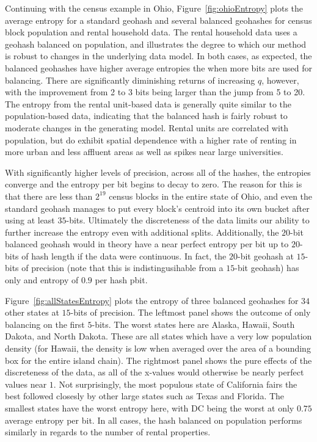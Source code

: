 \documentclass[nips13submit_09,times,art10]{article} %
\begin{document}
Continuing with the census example in Ohio, Figure~\ref{fig:ohioEntropy} plots the average
entropy for a standard geohash and several balanced geohashes for census block population
and rental household data. The rental household data uses a geohash balanced on population,
and illustrates the degree to which our method is robust to changes in the underlying data
model. In both cases, as expected, the balanced geohashes have higher average entropies the
when more bits are used for balancing. There are significantly diminishing returns of
increasing $q$, however,
with the improvement from 2 to 3 bits being larger than the jump from 5 to 20. The entropy
from the rental unit-based data is generally quite similar to the population-based data,
indicating that the balanced hash is fairly robust to moderate changes in the generating
model. Rental units are correlated with population, but do exhibit spatial dependence with
a higher rate of renting in more urban and less affluent areas as well as spikes near
large universities.

With significantly higher levels of precision, across all of the hashes, the entropies
converge and the entropy per bit begins to decay to zero. The reason for this is that
there are less than $2^{19}$ census blocks in the entire state of Ohio, and even the standard
geohash manages to put every block's centroid into its own bucket after using at least
$35$-bits. Ultimately the discreteness of the data limits our ability to further increase
the entropy even with additional splits. Additionally, the $20$-bit balanced geohash would
in theory have a near perfect entropy per bit up to $20$-bits of hash length if the data were
continuous. In fact, the $20$-bit geohash at $15$-bits of precision (note that this is
indistingusihable from a $15$-bit geohash) has only and entropy of $0.9$ per hash pbit.

Figure~\ref{fig:allStatesEntropy} plots the entropy of three balanced geohashes for
$34$ other states at $15$-bits of precision. The leftmost panel shows the outcome of
only balancing on the first $5$-bits. The worst states here are Alaska, Hawaii, South
Dakota, and North Dakota. These are all states which have a very low population density
(for Hawaii, the density is low when averaged over the area of a bounding box for the
entire island chain). The rightmost panel shows the pure effects
of the discreteness of the data, as all of the x-values would otherwise be nearly perfect
values near $1$. Not surprisingly, the most populous state of California fairs the best
followed closesly by other large states such as Texas and Florida. The smallest states
have the worst entropy here, with DC being the worst at only $0.75$ average entropy per bit.
In all cases, the hash balanced on population performs similarly in regards to the number
of rental properties.
\end{document}
